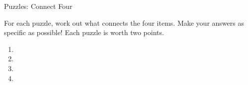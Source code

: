 
\newpage
\begin{center}
\Huge
Puzzles: Connect Four
\end{center}
\large
For each puzzle, work out what connects the four items. Make your answers as specific as possible! Each puzzle is worth two points.

\large
\begin{enumerate}
\item 
\item 
\item 
\item 
\end{enumerate}

